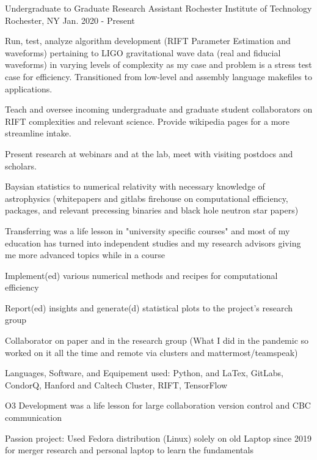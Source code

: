 \begin{cventries}

    \cventry
    {Undergraduate to Graduate Research Assistant}
    {Rochester Institute of Technology}
    {Rochester, NY}
    {Jan. 2020 - Present}
    {
      \begin{cvitems}
        \item {Run, test, analyze algorithm development (RIFT Parameter Estimation and waveforms) pertaining to LIGO gravitational wave data (real and fiducial waveforms) in varying levels of complexity as my case and problem is a stress test case for efficiency. Transitioned from low-level and assembly language makefiles to applications.}
        \item{Teach and oversee incoming undergraduate and graduate student collaborators on RIFT complexities and relevant science. Provide wikipedia pages for a more streamline intake.}
        \item{Present research at webinars and at the lab, meet with visiting postdocs and scholars.}
        \item{Baysian statistics to numerical relativity with necessary knowledge of astrophysics (whitepapers and gitlabs firehouse on computational efficiency, packages, and relevant precessing binaries and black hole neutron star papers)}
        \item{Transferring was a life lesson in "university specific courses" and most of my education has turned into independent studies and my research advisors giving me more advanced topics while in a course}
        \item{Implement(ed) various numerical methods and recipes for  computational efficiency}
        \item {Report(ed) insights and generate(d) statistical plots to the project's research group}
        \item {Collaborator on paper and in the research group (What I did in the pandemic so worked on it all the time and remote via clusters and mattermost/teamspeak)}
        \item {Languages, Software, and Equipement used: Python, and LaTex, GitLabs, CondorQ, Hanford and Caltech Cluster, RIFT, TensorFlow}
        \item{O3 Development was a life lesson for large collaboration version control and CBC communication}
        \item{Passion project: Used Fedora distribution (Linux) solely on old Laptop since 2019 for merger research and personal laptop to learn the fundamentals}

\end{cvitems}}
\end{cventries}
